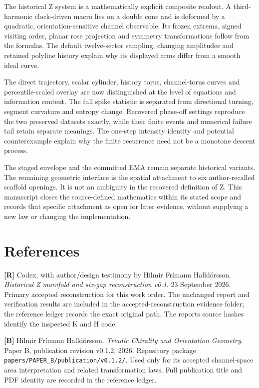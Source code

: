 \documentclass[
  11pt,
  a4paper,
]{article}
\begin{document}
The historical Z system is a mathematically explicit composite readout. A third-harmonic clock-driven macro lies on a double cone and is deformed by a quadratic, orientation-sensitive channel observable. Its frozen extrema, signed visiting order, planar rose projection and symmetry transformations follow from the formulas. The default twelve-sector sampling, changing amplitudes and retained polyline history explain why its displayed arms differ from a smooth ideal curve.

The direct trajectory, scalar cylinder, history torus, channel-torus curves and percentile-scaled overlay are now distinguished at the level of equations and information content. The full spike statistic is separated from directional turning, segment curvature and entropy change. Recovered phase-off settings reproduce the two preserved datasets exactly, while their finite events and numerical failure tail retain separate meanings. The one-step intensity identity and potential counterexample explain why the finite recurrence need not be a monotone descent process.

The staged envelope and the committed EMA remain separate historical variants. The remaining geometric interface is the spatial attachment to six author-recalled scaffold openings. It is not an ambiguity in the recovered definition of Z. This manuscript closes the source-defined mathematics within its stated scope and records that specific attachment as open for later evidence, without supplying a new law or changing the implementation.

\section{References}\label{references}

\textbf{{[}R{]}} Codex, with author/design testimony by Hilmir Frímann Halldórsson. \emph{Historical Z manifold and six-gap reconstruction v0.1}. 23 September 2026. Primary accepted reconstruction for this work order. The unchanged report and verification results are included in the accepted-reconstruction evidence folder; the reference ledger records the exact original path. The report\textquotesingle s source hashes identify the inspected K and H code.

\textbf{{[}B{]}} Hilmir Frímann Halldórsson. \emph{Triadic Chirality and Orientation Geometry}. Paper B, publication revision v0.1.2, 2026. Repository package \texttt{papers/PAPER\_B/publication/v0.1.2/}. Used only for its accepted channel-space area interpretation and related transformation laws. Full publication title and PDF identity are recorded in the reference ledger.
\end{document}
